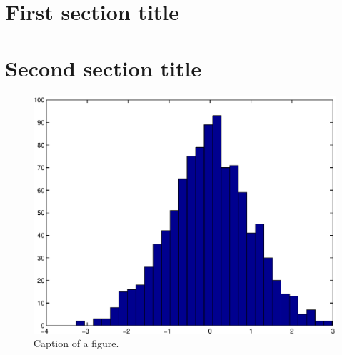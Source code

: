 \setcounter{equation}{0} 

\section{First section title}

\section{Second section title}

\begin{figure}[h]
\centering
\includegraphics[width = 4.5 in ]{figure.eps}
\caption{Caption of a figure.}\label{FigureLabel}
\end{figure}
